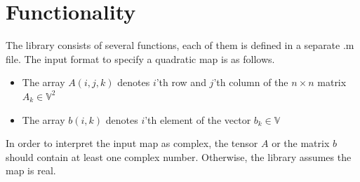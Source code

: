 \documentclass[a4paper]{article}
\theoremstyle{definition}
\begin{document}
\newpage

\section*{Functionality}
The library consists of several functions, each of them is defined in a separate .m file.
The input format to specify a quadratic map is as follows.

\begin{itemize}
\item The array $A(i, j, k)$ denotes $i$'th row and $j$'th column of the $n\times n$ matrix $A_k\in\mathbb{V}^2$
\item The array $b(i, k)$ denotes $i$'th element of the vector $b_k\in\mathbb{V}$
\end{itemize}

In order to interpret the input map as complex, the tensor $A$ or the matrix $b$ should contain at least one complex number. Otherwise, the library assumes the map is real.
\end{document}
